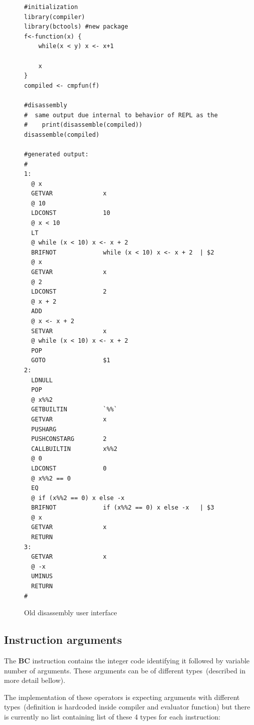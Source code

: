 \documentclass[thesis=M,english]{FITthesis}[2018/10/20]
\begin{document}
\begin{figure}[!h]
\begin{lstlisting}
#initialization
library(compiler)
library(bctools) #new package
f<-function(x) {
    while(x < y) x <- x+1

	x
}
compiled <- cmpfun(f)

#disassembly
#  same output due internal to behavior of REPL as the
#    print(disassemble(compiled))
disassemble(compiled)

#generated output:
#
1:
  @ x
  GETVAR              x
  @ 10
  LDCONST             10
  @ x < 10
  LT                  
  @ while (x < 10) x <- x + 2
  BRIFNOT             while (x < 10) x <- x + 2	 | $2
  @ x
  GETVAR              x
  @ 2
  LDCONST             2
  @ x + 2
  ADD                 
  @ x <- x + 2
  SETVAR              x
  @ while (x < 10) x <- x + 2
  POP                 
  GOTO                $1
2:
  LDNULL              
  POP                 
  @ x%%2
  GETBUILTIN          `%%`
  GETVAR              x
  PUSHARG             
  PUSHCONSTARG        2
  CALLBUILTIN         x%%2
  @ 0
  LDCONST             0
  @ x%%2 == 0
  EQ                  
  @ if (x%%2 == 0) x else -x
  BRIFNOT             if (x%%2 == 0) x else -x	 | $3
  @ x
  GETVAR              x
  RETURN              
3:
  GETVAR              x
  @ -x
  UMINUS              
  RETURN            
#
\end{lstlisting}
	\caption{Old disassembly user interface}\label{fig:new-disassembly-ui}
\end{figure}


\subsection{Instruction arguments}\label{instruction-arguments}
The \textbf{BC} instruction contains the integer code identifying it followed by variable number of arguments. These arguments can be of different types~(described in more detail bellow). 

The implementation of these operators is expecting arguments with different types~(definition is hardcoded inside compiler and evaluator function) but there is currently no list containing list of these 4 types for each instruction:
\end{document}
